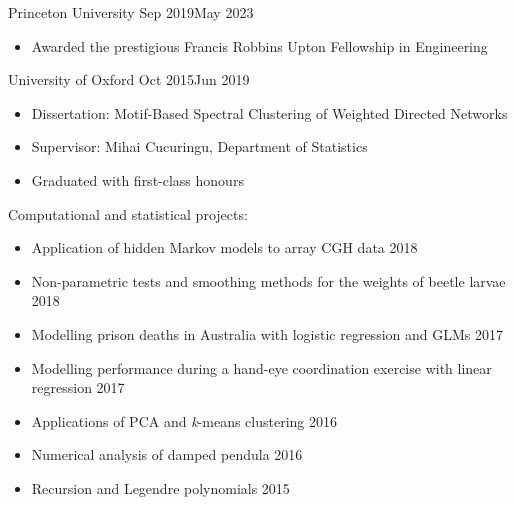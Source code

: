 \documentclass[
  date,
  number,
]{wgu-cv}
\begin{document}
\maketitle





{Princeton University}
{Sep 2019}{May 2023}

\begin{itemize}
	\item Awarded the prestigious Francis Robbins Upton Fellowship in Engineering
\end{itemize}


{University of Oxford}
{Oct 2015}{Jun 2019}

\begin{itemize}
    \item Dissertation: Motif-Based Spectral Clustering of Weighted Directed
      Networks
    \item Supervisor: Mihai Cucuringu, Department of Statistics
    \item Graduated with first-class honours
\end{itemize}

Computational and statistical projects:

\begin{itemize}
	\item Application of hidden Markov models to array CGH data \hfill 2018%
	\item Non-parametric tests and smoothing methods for the weights of beetle
      larvae \hfill 2018%
	\item Modelling prison deaths in Australia with logistic regression and GLMs
      \hfill 2017%
	\item Modelling performance during a hand-eye coordination exercise with
      linear regression \hfill 2017%
	\item Applications of PCA and \textit{k}-means clustering \hfill 2016%
	\item Numerical analysis of damped pendula \hfill 2016%
	\item Recursion and Legendre polynomials \hfill 2015%
\end{itemize}
\end{document}
